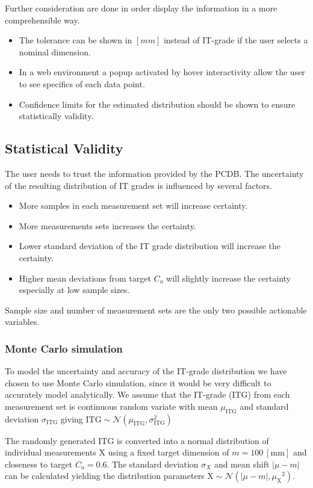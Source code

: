 \documentclass[aip,amsmath, reprint, author-year]{revtex4-1}
\begin{document}
Further consideration are done in order display the information in a more comprehensible way.
\begin{itemize}
\item The tolerance can be shown in $[mm]$ instead of IT-grade if the user selects a nominal dimension.
\item In a web environment a popup activated by hover interactivity allow the user to see specifics of each data point.
\item Confidence limits for the estimated distribution should be shown to ensure statistically validity.
\end{itemize}





\subsection{Statistical Validity}
The user needs to trust the information provided by the PCDB. 
The uncertainty of the resulting distribution of IT grades is influenced by several factors.
\begin{itemize}
\item More samples in each measurement set will increase certainty. 
\item More measurements sets increases the certainty. 
\item Lower standard deviation of the IT grade distribution will increase the certainty.
\item Higher mean deviations from target $C_a$ will slightly increase the certainty especially at low sample sizes.
\end{itemize}
Sample size and number of measurement sets are the only two possible actionable variables. 

\subsubsection{Monte Carlo simulation}
To model the uncertainty and accuracy of the IT-grade distribution we have chosen to use Monte Carlo simulation, since it would be very difficult to accurately model analytically. 
We assume that the IT-grade (ITG) from each measurement set is continuous random variate with mean $\mu_{\mathrm{ITG}}$ and standard deviation $\sigma_{\mathrm{ITG}}$ giving $\mathrm{ITG} \sim \mathcal{N} (\mu_{\mathrm{ITG}}, \sigma_{\mathrm{ITG}}^2)$

The randomly generated ITG is converted into a normal distribution of individual measurements X using a fixed target dimension of $m = 100 \mathrm{\ [mm]}$ and closeness to target $C_a = 0.6$. 
The standard deviation $\sigma_{X}$ and mean shift $| \mu - m|$ can be calculated yielding the distribution parameters $\mathrm{X} \sim \mathcal{N} (| \mu - m|, {\mu_{\mathrm{X}}}^2)$. 
\end{document}
